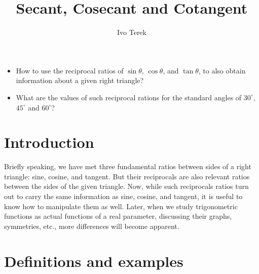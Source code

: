 \documentclass{ximera}
\author{Ivo Terek}
\title{Secant, Cosecant and Cotangent}
\begin{document}
\begin{abstract}
  
\end{abstract}
\maketitle



\begin{motivatingQuestions}\begin{itemize}
\item How to use the reciprocal ratios of $\sin\theta$, $\cos\theta$, and $\tan\theta$, to also obtain information about a given right triangle?
\item What are the values of such reciprocal rations for the standard angles of $30^\circ$, $45^\circ$ and $60^\circ$?
\end{itemize}\end{motivatingQuestions}



\section{Introduction}

Briefly speaking, we have met three fundamental ratios between sides of a right triangle: sine, cosine, and tangent. But their reciprocals are also relevant ratios between the sides of the given triangle. Now, while such reciprocals ratios turn out to carry the same information as sine, cosine, and tangent, it is useful to know how to manipulate them as well. Later, when we study trigonometric functions as actual functions of a real parameter, discussing their graphs, symmetries, etc., more differences will become apparent.


\section{Definitions and examples}
\end{document}
